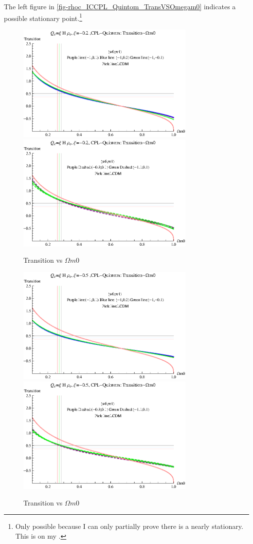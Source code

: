 \documentclass[12pt,a4paper]{article}
\begin{document}
The left figure in \ref{fig-rhoc_ICCPL_Quintom_TransVSOmegam0} indicates a possible stationary point.\footnote{Only possible because I can only partially prove there is a nearly stationary. This is on my \CN .}


\begin{figure}
\centering
\includegraphics[width=250pt]{rhoc_ICCPL_Quintom_TransVSOmegam021.eps}
\includegraphics[width=250pt]{rhoc_ICCPL_Quintom_TransVSOmegam022.eps}
\caption{Transition vs $\Omega m0$}\label{fig-rhoc_ICCPL_Quintom_TransVSOmegam02}
\end{figure}



\begin{figure}
\centering
\includegraphics[width=250pt]{rhoc_ICCPL_Quintom_TransVSOmegam051.eps}
\includegraphics[width=250pt]{rhoc_ICCPL_Quintom_TransVSOmegam052.eps}
\caption{Transition vs $\Omega m0$}\label{fig-rhoc_ICCPL_Quintom_TransVSOmegam05}
\end{figure}
\end{document}
